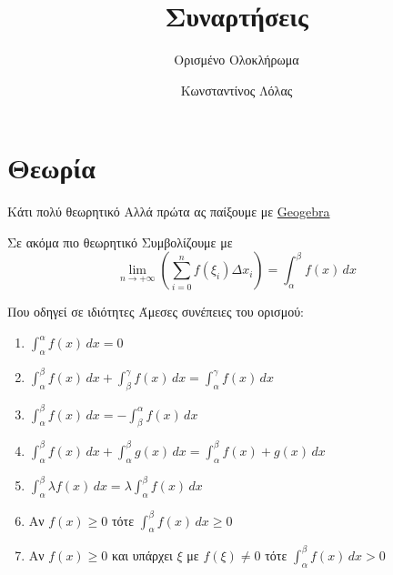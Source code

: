 \documentclass{presentation}
\title{Συναρτήσεις}
\subtitle{Ορισμένο Ολοκλήρωμα}
\author[Λόλας]{Κωνσταντίνος Λόλας}
\institute[$10^ο$ ΓΕΛ]{$10^ο$ ΓΕΛ Θεσσαλονίκης}
\date{}
\begin{document}
\begin{frame}
    \titlepage
\end{frame}

\section{Θεωρία}
\begin{frame}{Κάτι πολύ θεωρητικό}
    Αλλά πρώτα ας παίξουμε με \href{https://www.geogebra.org/classic/asyjagxx}{Geogebra}
\end{frame}

\begin{frame}{Σε ακόμα πιο θεωρητικό}
    Συμβολίζουμε με
    $$\lim_{n\to +\infty}\left( {\sum_{i=0}^{n}f(ξ_i)Δx_i} \right)=\int_α^β f(x)\,dx $$
\end{frame}

\begin{frame}{Που οδηγεί σε ιδιότητες}
    Άμεσες συνέπειες του ορισμού:
    \begin{enumerate}[<+->]
        \item $\int_α^α f(x)\,dx =0$
        \item $\int_α^β f(x)\,dx + \int_β^γ f(x)\,dx =\int_α^γ f(x)\,dx $
        \item $\int_α^β f(x)\,dx = -\int_β^α f(x)\,dx$
        \item $\int_α^β f(x)\,dx + \int_α^β g(x)\,dx =\int_α^β f(x)+g(x)\,dx $
        \item $\int_α^β λf(x)\,dx =λ \int_α^β f(x)\,dx$
        \item Αν $f(x)\ge 0$ τότε $\int_α^β f(x)\,dx \ge 0$
        \item Αν $f(x)\ge 0$ και υπάρχει $ξ$ με $f(ξ)\ne 0$ τότε $\int_α^β f(x)\,dx > 0$
    \end{enumerate}
\end{frame}
\end{document}
